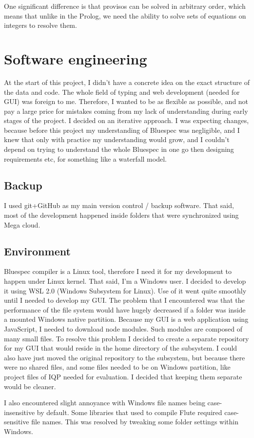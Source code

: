 \documentclass[12pt]{report}
\begin{document}
One significant difference is that provisos can be solved in arbitrary order, which means that unlike in the Prolog, we need the ability to solve sets of equations on integers to resolve them.
\section{Software engineering}
At the start of this project, I didn't have a concrete idea on the exact structure of the data and code. The whole field of typing and web development (needed for GUI) was foreign to me. Therefore, I wanted to be as flexible as possible, and not pay a large price for mistakes coming from my lack of understanding during early stages of the project. I decided on an iterative approach. I was expecting changes, because before this project my understanding of Bluespec was negligible, and I knew that only with practice my understanding would grow, and I couldn't depend on trying to understand the whole Bluespec in one go then designing requirements etc, for something like a waterfall model.
\subsection{Backup}
I used git+GitHub as my main version control / backup software. That said, most of the development happened inside folders that were synchronized using Mega cloud.
\subsection{Environment}
Bluespec compiler is a Linux tool, therefore I need it for my development to happen under Linux kernel.
That said, I'm a Windows user.
I decided to develop it using WSL 2.0 (Windows Subsystem for Linux).
Use of it went quite smoothly until I needed to develop my GUI.
The problem that I encountered was that the performance of the file system would have hugely decreased if a folder was inside a mounted Windows native partition.
Because my GUI is a web application using JavaScript, I needed to download node modules.
Such modules are composed of many small files. To resolve this problem I decided to create a separate repository for my GUI that would reside in the home directory of the subsystem.
I could also have just moved the original repository to the subsystem, but because there were no shared files, and some files needed to be on Windows partition, like project files of IQP needed for evaluation.
I decided that keeping them separate would be cleaner.
\par
I also encountered slight annoyance with Windows file names being case-insensitive by default. Some libraries that used to compile Flute \cite{Flute core} required case-sensitive file names. This was resolved by tweaking some folder settings within Windows.
\end{document}
